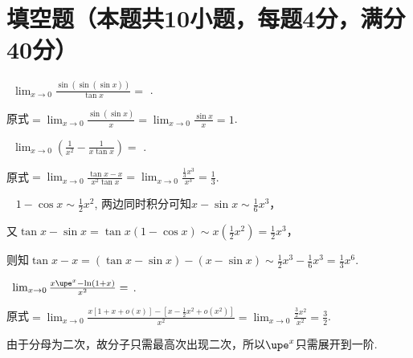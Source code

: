 \documentclass{USTBExam}
\author{北京科技大学学生学习与发展指导中心·朋辈讲师团·高数组·黄腾}
\begin{document}
\maketitle

\section{填空题（本题共10小题，每题4分，满分40分）}

\begin{problem}
  ~$\lim _{x \to 0} \frac{\sin (\sin (\sin x))}{\tan x}=$
  \fillin[1].
\end{problem}

\begin{analysis}
  原式$=\lim_{x \to 0} \frac{\sin\left( \sin x \right)}{x} = \lim_{x \to 0} \frac{\sin x}{x} = 1$.
\end{analysis}

\begin{problem}
  ~$\lim _{x \to 0}\left(\frac{1}{x^{2}}-\frac{1}{x \tan x}\right)=$
  \fillin[$\frac{1}{3}$].
\end{problem}

\begin{analysis}
  原式$=\lim_{x \to 0} \frac{\tan x - x}{x^2 \tan x} = \lim_{x \to 0} \frac{\frac{1}{3}x^3}{x^3} = \frac{1}{3}$.

  \faMortarBoard~ $1 - \cos x \sim \frac{1}{2}x^2$, 两边同时积分可知$x - \sin x \sim \frac{1}{6}x^3$，

  又$\tan x - \sin x = \tan x \left( 1 - \cos x \right) \sim x \left( \frac{1}{2}x^2 \right) = \frac{1}{2}x^3$，

  则知$\tan x - x = \left( \tan x - \sin x \right) - \left( x - \sin x \right) \sim \frac{1}{2}x^3 - \frac{1}{6} x^3 = \frac{1}{3}x^6$.
\end{analysis}

\begin{problem}
  ~$\lim _{x \to 0} \frac{x \upe^{x}-\ln (1+x)}{x^{2}}=$
  \fillin[$\frac{3}{2}$].
\end{problem}

\begin{analysis}
  原式$=\lim_{x \to 0} \frac{x \left[ 1+x+o(x) \right] - \left[ x - \frac{1}{2}x^2 +o(x^2) \right]}{x^2} = \lim_{x \to 0} \frac{\frac{3}{2}x^2}{x^2} = \frac{3}{2}$.

  \faMortarBoard 由于分母为二次，故分子只需最高次出现二次，所以$\upe^x$只需展开到一阶.
\end{analysis}
\end{document}
